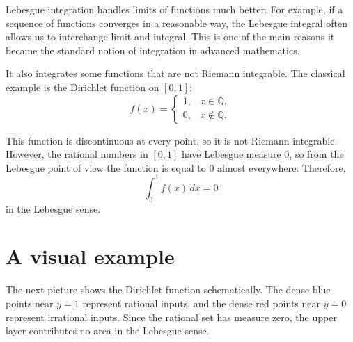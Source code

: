 Lebesgue integration handles limits of functions much better. For example, if a sequence of functions converges in a reasonable way, the Lebesgue integral often allows us to interchange limit and integral. This is one of the main reasons it became the standard notion of integration in advanced mathematics.

It also integrates some functions that are not Riemann integrable. The classical example is the Dirichlet function on $[0,1]$:
\[
f(x)=
\begin{cases}
1, & x \in \mathbb{Q},\\
0, & x \notin \mathbb{Q}.
\end{cases}
\]

This function is discontinuous at every point, so it is not Riemann integrable. However, the rational numbers in $[0,1]$ have Lebesgue measure $0$, so from the Lebesgue point of view the function is equal to $0$ almost everywhere. Therefore,
\[
\int_0^1 f(x)\,dx = 0
\]
in the Lebesgue sense.

\section*{A visual example}

The next picture shows the Dirichlet function schematically. The dense blue points near $y=1$ represent rational inputs, and the dense red points near $y=0$ represent irrational inputs. Since the rational set has measure zero, the upper layer contributes no area in the Lebesgue sense.

\begin{center}
\end{center}

